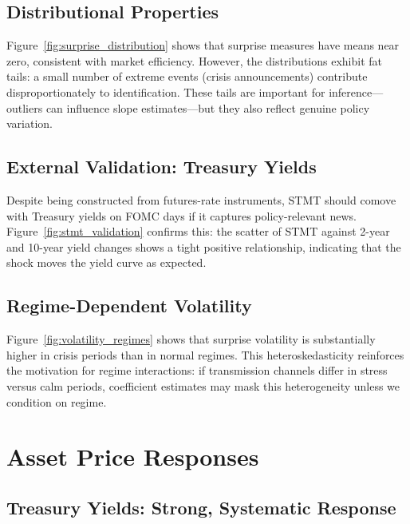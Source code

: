 \documentclass[12pt]{article}
\begin{document}
\subsection{Distributional Properties}

Figure~\ref{fig:surprise_distribution} shows that surprise measures have means near zero, consistent with market efficiency. However, the distributions exhibit fat tails: a small number of extreme events (crisis announcements) contribute disproportionately to identification. These tails are important for inference---outliers can influence slope estimates---but they also reflect genuine policy variation.

\subsection{External Validation: Treasury Yields}

Despite being constructed from futures-rate instruments, STMT should comove with Treasury yields on FOMC days if it captures policy-relevant news. Figure~\ref{fig:stmt_validation} confirms this: the scatter of STMT against 2-year and 10-year yield changes shows a tight positive relationship, indicating that the shock moves the yield curve as expected.

\subsection{Regime-Dependent Volatility}

Figure~\ref{fig:volatility_regimes} shows that surprise volatility is substantially higher in crisis periods than in normal regimes. This heteroskedasticity reinforces the motivation for regime interactions: if transmission channels differ in stress versus calm periods, coefficient estimates may mask this heterogeneity unless we condition on regime.

\section{Asset Price Responses}
\label{sec:responses}

\subsection{Treasury Yields: Strong, Systematic Response}
\end{document}
